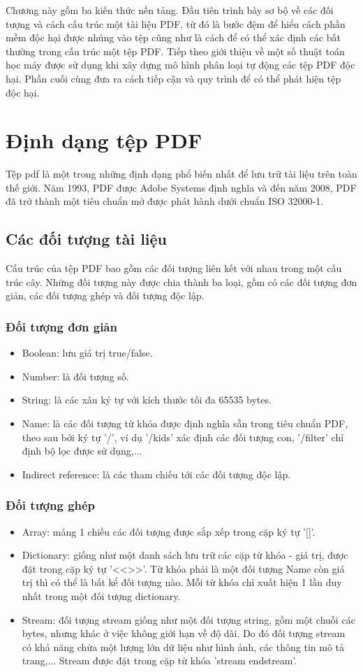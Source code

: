 \documentclass[./../main.tex]{subfiles}
\begin{document}
Chương này gồm ba kiến thức nền tảng. Đầu tiên trình bày sơ bộ về các đối tượng và cách cấu trúc một tài liệu PDF, từ đó là bước đệm để hiểu cách phần mềm độc hại được nhúng vào tệp cũng như là cách để có thể xác định các bất thường trong cấu trúc một tệp PDF. Tiếp theo giới thiệu về một số thuật toán học máy được sử dụng khi xây dựng mô hình phân loại tự động các tệp PDF độc hại. Phần cuối cùng đưa ra cách tiếp cận và quy trình để có thể phát hiện tệp độc hại.
\section{Định dạng tệp PDF}
Tệp pdf là một trong những định dạng phổ biến nhất để lưu trữ tài liệu trên toàn thế giới. Năm 1993, PDF được Adobe Systems định nghĩa và đến năm 2008, PDF đã trở thành một tiêu chuẩn mở được phát hành dưới chuẩn ISO 32000-1.
\subsection{Các đối tượng tài liệu}
Cấu trúc của tệp PDF bao gồm các đối tượng liên kết với nhau trong một cấu trúc cây. Những đối tượng này được chia thành ba loại, gồm có các đối tượng đơn giản, các đối tượng ghép và đối tượng độc lập.
\subsubsection*{Đối tượng đơn giản}
\begin{itemize}
	\item Boolean: lưu giá trị true/false.
	\item Number: là đối tượng số.
	\item String: là các xâu ký tự với kích thước tối đa 65535 bytes.
	\item Name: là các đối tượng từ khóa được định nghĩa sẵn trong tiêu chuẩn PDF, theo sau bởi ký tự '/', ví dụ '/kids' xác định các đối tượng con, '/filter' chỉ định bộ lọc được sử dụng,...
	\item Indirect reference: là các tham chiếu tới các đối tượng độc lập.
\end{itemize}
\subsubsection*{Đối tượng ghép}

\begin{itemize}
	\item Array: mảng 1 chiều các đối tượng được sắp xếp trong cặp ký tự '[]'.
	\item Dictionary: giống như một danh sách lưu trữ các cặp từ khóa - giá trị, được đặt trong cặp ký tự  '<<>>'. Từ khóa phải là một đối tượng Name còn giá trị thì có thể là bất kể đối tượng nào. Mỗi từ khóa chỉ xuất hiện 1 lần duy nhất trong một đối tượng dictionary.
	\item Stream: đối tượng stream giống như một đối tượng string, gồm một chuỗi các bytes, nhưng khác ở việc không giới hạn về độ dài. Do đó đối tượng stream có khả năng chứa một lượng lớn dữ liệu như hình ảnh, các thông tin mô tả trang,... Stream được đặt trong cặp từ khóa 'stream endstream'.
\end{itemize}
\end{document}
